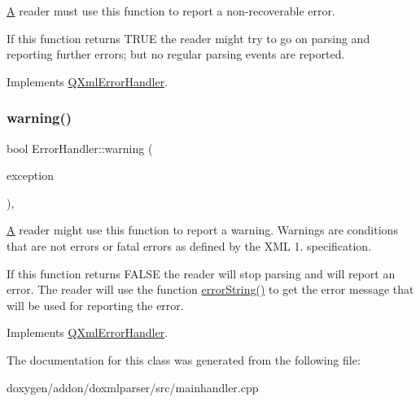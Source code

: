 \mbox{\hyperlink{class_a}{A}} reader must use this function to report a non-\/recoverable error.

If this function returns T\+R\+UE the reader might try to go on parsing and reporting further errors; but no regular parsing events are reported. 

Implements \mbox{\hyperlink{class_q_xml_error_handler_aaa8c1ad1b42a5257cf2344c7fe101797}{Q\+Xml\+Error\+Handler}}.

\mbox{\label{class_error_handler_abb147190a3d48dae251d7db795d9e28d}} 
\subsubsection{\texorpdfstring{warning()}{warning()}}
{\footnotesize\ttfamily bool Error\+Handler\+::warning (\begin{DoxyParamCaption}\item[{const \mbox{\hyperlink{class_q_xml_parse_exception}{Q\+Xml\+Parse\+Exception}} \&}]{exception }\end{DoxyParamCaption})\hspace{0.3cm}{\ttfamily [inline]}, {\ttfamily [virtual]}}

\mbox{\hyperlink{class_a}{A}} reader might use this function to report a warning. Warnings are conditions that are not errors or fatal errors as defined by the X\+ML 1. specification.

If this function returns F\+A\+L\+SE the reader will stop parsing and will report an error. The reader will use the function \mbox{\hyperlink{class_error_handler_a193381152001d019c4155600a61c478d}{error\+String()}} to get the error message that will be used for reporting the error. 

Implements \mbox{\hyperlink{class_q_xml_error_handler_a79ae0cce3316a76b7777c6e90b101afe}{Q\+Xml\+Error\+Handler}}.



The documentation for this class was generated from the following file\+:\begin{DoxyCompactItemize}
\item 
doxygen/addon/doxmlparser/src/mainhandler.\+cpp\end{DoxyCompactItemize}
